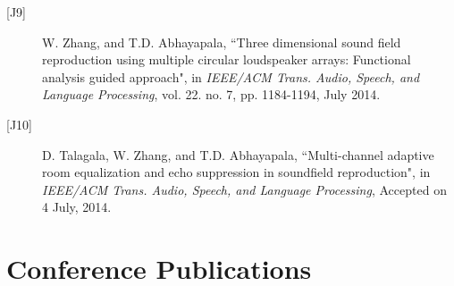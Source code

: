 \documentclass[11pt]{article}
\begin{document}
\begin{description}
\item[{[}J9{]}]W. Zhang, and T.D. Abhayapala, ``Three dimensional sound field reproduction using multiple circular loudspeaker arrays: Functional analysis guided approach", in {\em IEEE/ACM Trans. Audio, Speech, and Language Processing}, vol. 22. no. 7, pp. 1184-1194, July 2014.

\item[{[}J10{]}]D. Talagala, W. Zhang, and T.D. Abhayapala, ``Multi-channel adaptive room equalization and echo suppression in soundfield reproduction", in {\em IEEE/ACM Trans. Audio, Speech, and Language Processing},  Accepted on 4 July, 2014.


\end{description}

\section*{Conference Publications}
\end{document}
